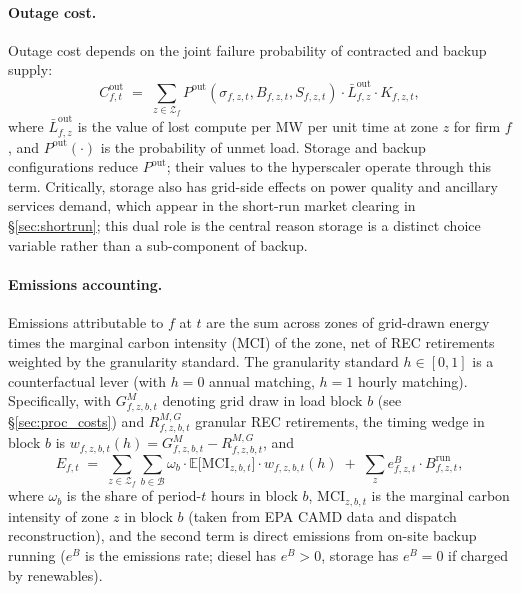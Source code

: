 \documentclass[12pt,letterpaper]{article}
\begin{document}
\paragraph{Outage cost.} Outage cost depends on the joint failure
probability of contracted and backup supply:
\begin{equation}
\label{eq:outage_cost}
C^{\mathrm{out}}_{f,t} \;=\; \sum_{z \in \mathcal{Z}_f}
P^{\mathrm{out}}(\sigma_{f,z,t}, B_{f,z,t}, S_{f,z,t}) \cdot
\bar L^{\mathrm{out}}_{f,z} \cdot K_{f,z,t},
\end{equation}
where $\bar L^{\mathrm{out}}_{f,z}$ is the value of lost compute per MW per
unit time at zone $z$ for firm $f$, and $P^{\mathrm{out}}(\cdot)$ is the
probability of unmet load. Storage and backup configurations reduce
$P^{\mathrm{out}}$; their values to the hyperscaler operate through this
term. Critically, storage also has grid-side effects on power quality and
ancillary services demand, which appear in the short-run market clearing
in \S\ref{sec:shortrun}; this dual role is the central reason storage is a
distinct choice variable rather than a sub-component of backup.

\paragraph{Emissions accounting.} Emissions attributable to $f$ at $t$ are
the sum across zones of grid-drawn energy times the marginal carbon
intensity (MCI) of the zone, net of REC retirements weighted by the
granularity standard. The granularity standard $h \in [0,1]$ is a
counterfactual lever (with $h=0$ annual matching, $h=1$ hourly matching).
Specifically, with $G^M_{f,z,b,t}$ denoting grid draw in load block $b$
(see \S\ref{sec:proc_costs}) and $R^{M,G}_{f,z,b,t}$ granular REC retirements,
the timing wedge in block $b$ is $w_{f,z,b,t}(h) = G^M_{f,z,b,t} -
R^{M,G}_{f,z,b,t}$, and
\begin{equation}
\label{eq:emissions}
E_{f,t} \;=\; \sum_{z \in \mathcal{Z}_f} \sum_{b \in \mathcal{B}}
\omega_b \cdot \mathbb{E}\big[\text{MCI}_{z,b,t}\big] \cdot w_{f,z,b,t}(h)
\;+\; \sum_{z} e^B_{f,z,t} \cdot B^{\text{run}}_{f,z,t},
\end{equation}
where $\omega_b$ is the share of period-$t$ hours in block $b$,
$\text{MCI}_{z,b,t}$ is the marginal carbon intensity of zone $z$ in block
$b$ (taken from EPA CAMD data and dispatch reconstruction), and the second
term is direct emissions from on-site backup running ($e^B$ is the emissions
rate; diesel has $e^B > 0$, storage has $e^B = 0$ if charged by renewables).
\end{document}

